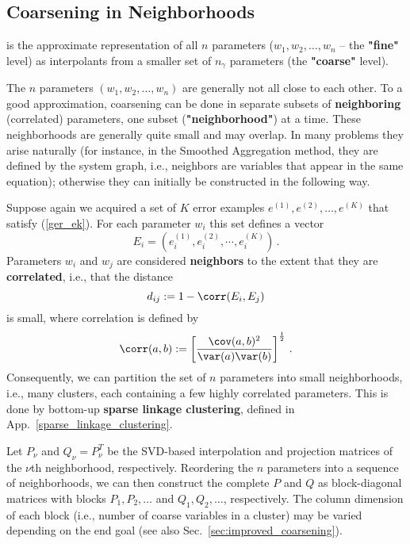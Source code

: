 \documentclass{article} %
\begin{document}
\subsection{Coarsening in Neighborhoods}
\label{sec:neighborhoods}
 is the approximate representation of all $n$ parameters ($w_1, w_2, \dots, w_n$ -- the \textbf{"fine"} level) as interpolants from a smaller set of $n_{\gamma}$ parameters (the \textbf{"coarse"} level).

The $n$ parameters $(w_1, w_2, \dots, w_n)$ are generally not all close to each other. To a good approximation, coarsening can be done in separate subsets of \textbf{neighboring} (correlated) parameters, one subset (\textbf{"neighborhood"}) at a time. These neighborhoods are generally quite small and may overlap. In many problems they arise naturally (for instance, in the Smoothed Aggregation method, they are defined by the system graph, i.e., neighbors are variables that appear in the same equation); otherwise they can initially be constructed in the following way.

Suppose again we acquired a set of $K$ error examples $e^{(1)}, e^{(2)}, \dots, e^{(K)}$ that satisfy (\ref{ger_ek}). For each parameter $w_i$ this set defines a vector
$$
	E_i = \left( e^{(1)}_i, e^{(2)}_i, \cdots, e^{(K)}_i \right)\,.
$$
Parameters $w_i$ and $w_j$ are considered \textbf{neighbors} to the extent that they are \textbf{correlated}, i.e., that the distance
\begin{equation}
	d_{ij} := 1 - \corr(E_i, E_j)
	\label{dij}
\end{equation}
is small, where correlation is defined by
\begin{equation}
    \corr(a, b) := \left[\frac{\cov(a, b)^2}{\var(a) \var(b)}\right]^{\frac12}\,.
\end{equation}
Consequently, we can partition the set of $n$ parameters into small neighborhoods, i.e., many clusters, each containing a few highly correlated parameters. This is done by bottom-up \textbf{sparse linkage clustering}, defined in App.~\ref{sparse_linkage_clustering}.

Let $P_{\nu}$ and $Q_{\nu} = P_{\nu}^T$ be the SVD-based interpolation and projection matrices of the $\nu$th neighborhood, respectively. Reordering the $n$ parameters into a sequence of neighborhoods, we can then construct the complete $P$ and $Q$ as block-diagonal matrices with blocks $P_1, P_2, \dots$ and $Q_1, Q_2, \dots$, respectively. The column dimension of each block (i.e., number of coarse variables in a cluster) may be varied depending on the end goal (see also Sec.~\ref{sec:improved_coarsening}).
\end{document}

